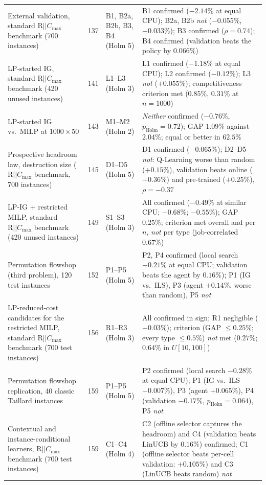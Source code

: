 \begin{longtable}{@{}p{}p{}p{}p{}@{}}
External validation, standard $\mathrm{R}||C_{\max}$ benchmark (700 instances) & 137 & B1, B2a, B2b, B3, B4 (Holm 5) & B1 confirmed ($-2.14\%$ at equal CPU); B2a, B2b \emph{not} ($-0.055\%$, $-0.033\%$); B3 confirmed ($\rho=0.74$); B4 confirmed (validation beats the policy by $0.066\%$) \\
LP-started IG, standard $\mathrm{R}||C_{\max}$ benchmark (420 unused instances) & 141 & L1--L3 (Holm 3) & L1 confirmed ($-1.18\%$ at equal CPU); L2 confirmed ($-0.12\%$); L3 \emph{not} ($+0.055\%$); competitiveness criterion met ($0.85\%$, $0.31\%$ at $n=1000$) \\
LP-started IG vs.\ MILP at $1000\times50$ & 143 & M1--M2 (Holm 2) & \emph{Neither} confirmed ($-0.76\%$, $p_{\mathrm{Holm}}=0.72$); GAP $1.09\%$ against $2.04\%$; equal or better in $62.5\%$ \\
Prospective headroom law, destruction size ($\mathrm{R}||C_{\max}$ benchmark, 700 instances) & 145 & D1--D5 (Holm 5) & D1 confirmed ($-0.065\%$); D2--D5 \emph{not}: Q-Learning worse than random ($+0.15\%$), validation beats online ($+0.36\%$) and pre-trained ($+0.25\%$), $\rho=-0.37$ \\
LP-IG + restricted MILP, standard $\mathrm{R}||C_{\max}$ benchmark (420 unused instances) & 149 & S1--S3 (Holm 3) & All confirmed ($-0.49\%$ at similar CPU; $-0.68\%$; $-0.55\%$); GAP $0.25\%$; criterion met overall and per $n$, \emph{not} per type (job-correlated $0.67\%$) \\
Permutation flowshop (third problem), 120 test instances & 152 & P1--P5 (Holm 5) & P2, P4 confirmed (local search $-0.21\%$ at equal CPU; validation beats the agent by $0.16\%$); P1 (IG vs.\ ILS), P3 (agent $+0.14\%$, worse than random), P5 \emph{not} \\
LP-reduced-cost candidates for the restricted MILP, standard $\mathrm{R}||C_{\max}$ benchmark (700 test instances) & 156 & R1--R3 (Holm 3) & All confirmed in sign; R1 negligible ($-0.03\%$); criterion (GAP $\leq0.25\%$; every type $\leq0.5\%$) \emph{not} met ($0.27\%$; $0.64\%$ in $U[10,100]$) \\
Permutation flowshop replication, 40 classic Taillard instances & 159 & P1--P5 (Holm 5) & P2 confirmed (local search $-0.28\%$ at equal CPU); P1 (IG vs.\ ILS $-0.007\%$), P3 (agent $+0.065\%$), P4 (validation $-0.17\%$, $p_{\mathrm{Holm}}=0.064$), P5 \emph{not} \\
Contextual and instance-conditional learners, $\mathrm{R}||C_{\max}$ benchmark (700 test instances) & 159 & C1--C4 (Holm 4) & C2 (offline selector captures the headroom) and C4 (validation beats LinUCB by $0.16\%$) confirmed; C1 (offline selector beats per-cell validation: $+0.105\%$) and C3 (LinUCB beats random) \emph{not} \\

\end{longtable}
